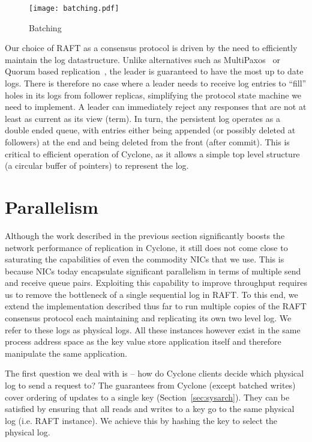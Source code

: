\documentclass[twocolumn]{article}
\begin{document}
\begin{figure}
  \centering
  \texttt{[image: batching.pdf]}
  \caption{Batching}
  \label{fig:batching}
\end{figure}

Our choice of RAFT as a consensus protocol is driven by the need to efficiently
maintain the log datastructure. Unlike alternatives such as
MultiPaxos~\cite{multipaxos} or Quorum based replication~\cite{quorum}, the
leader is guaranteed to have the most up to date logs. There is therefore no
case where a leader needs to receive log entries to ``fill'' holes in its logs
from follower replicas, simplifying the protocol state machine we need to
implement. A leader can immediately reject any responses that are not at least
as current as its view (term). In turn, the persistent log operates as a double
ended queue, with entries either being appended (or possibly deleted at
followers) at the end and being deleted from the front (after commit). This is
critical to efficient operation of Cyclone, as it allows a simple top level
structure (a circular buffer of pointers) to represent the log.

\section{Parallelism}
\label{sec:parallelism}


Although the work described in the previous section significantly boosts the
network performance of replication in Cyclone, it still does not come close to
saturating the capabilities of even the commodity NICs that we use. This is
because NICs today encapsulate significant parallelism in terms of
multiple send and receive queue pairs. Exploiting this capability to improve
throughput requires us to remove the bottleneck of a single sequential log in
RAFT. To this end, we extend the implementation described thus far to run
multiple copies of the RAFT consensus protocol each maintaining and replicating
its own two level log. We refer to these logs as physical logs. All these
instances however exist in the same process address space as the key value store
application itself and therefore manipulate the same application.

The first question we deal with is -- how do Cyclone clients decide which
physical log to send a request to? The guarantees from Cyclone (except batched
writes)  cover ordering of
updates to a single key (Section~\ref{sec:sysarch}). They can be satisfied by
ensuring that all reads and writes to a key go to the same physical log
(i.e. RAFT instance). We achieve this by hashing the key to select the physical
log.
\end{document}
